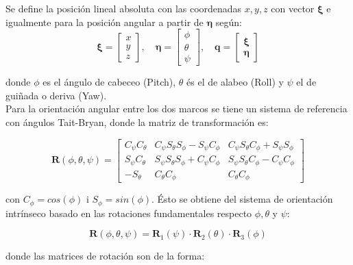 \documentclass[twoside,11pt]{book}
\begin{document}
Se define la posición lineal absoluta con las coordenadas $x,y,z$ con vector $\pmb{\xi}$ e igualmente para la posición angular a partir de $\pmb{\eta}$ según:
\begin{equation} 
\pmb{\xi}=\left[ \begin{array}{ccc}
x\\
y\\
z \end{array} \right] ,\quad \pmb{\eta}=\left[ \begin{array}{ccc}
\phi\\
\theta\\
\psi \end{array} \right] , \quad \pmb{q}=\left[\begin{array}{c}
\pmb{\xi}\\
\pmb{\eta} \end{array} \right] 
\end{equation}

donde $\phi$ es el ángulo de cabeceo (Pitch), $\theta$ és el de alabeo (Roll) y $\psi$ el de guiñada o deriva (Yaw).\\
Para la orientación angular entre los dos marcos se tiene un sistema de referencia con ángulos Tait-Bryan, donde la matriz de transformación es:

\begin{equation}
\pmb{R}(\phi,\theta,\psi)=\left[\begin{array}{ccc}
C_\psi C_\theta & C_\psi S_\theta S_\phi - S_\psi C_\phi & C_\psi S_\theta C_\phi + S_\psi S_\phi \\
S_\psi C_\theta & S_\psi S_\theta S_\phi + C_\psi C_\phi & S_\psi S_\theta C_\phi - C_\psi C_\phi \\
-S_\theta & C_\theta C_\phi & C_\theta C_\phi 
\end{array}\right]
\end{equation}

con $C_\phi=cos(\phi)$ i $S_\phi=sin(\phi)$. Ésto se obtiene del sistema de  orientación intrínseco basado en las rotaciones fundamentales respecto $\phi,\theta$ y $\psi$:

\begin{equation}
\pmb{R}(\phi,\theta,\psi)=\pmb{R}_{1}(\psi)\cdot \pmb{R}_{2}(\theta)\cdot \pmb{R}_{3}(\phi)
\end{equation}

donde las matrices de rotación son de la forma:
\end{document}
